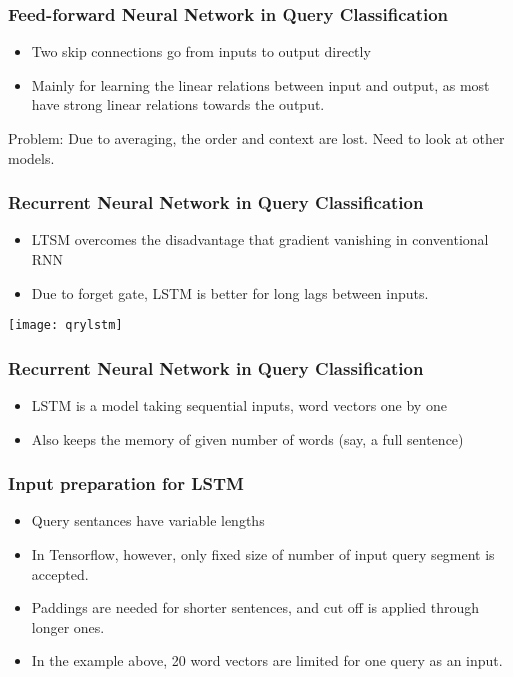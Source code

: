 \begin{frame}[fragile] \frametitle{Feed-forward Neural Network in Query Classification}
\begin{itemize}
\item Two skip connections go from inputs to output directly
\item Mainly for learning the linear relations between input and output, as most have strong linear relations towards the output.
\end{itemize}
Problem: Due to averaging, the order and context are lost. Need to look at other models.
\end{frame}




\begin{frame}[fragile] \frametitle{Recurrent Neural Network in Query Classification}
\begin{itemize}
\item LTSM overcomes the disadvantage that gradient vanishing in conventional RNN
\item Due to forget gate, LSTM is better for long lags between inputs.
\end{itemize}
\begin{center}
\texttt{[image: qrylstm]}
\end{center}
\end{frame}


\begin{frame}[fragile] \frametitle{Recurrent Neural Network in Query Classification}
\begin{itemize}
\item LSTM is a model taking sequential inputs, word vectors one by one
\item Also keeps the memory of given number of words (say, a full sentence)
\end{itemize}
\end{frame}


\begin{frame}[fragile] \frametitle{Input preparation for LSTM}
\begin{itemize}
\item Query sentances have variable lengths
\item In Tensorflow, however, only fixed size of number of input query segment is accepted. 
\item Paddings are needed for shorter sentences, and cut off is applied through longer ones. 
\item In the example above, 20 word vectors are limited for one query as an input.
\end{itemize}
\end{frame}


